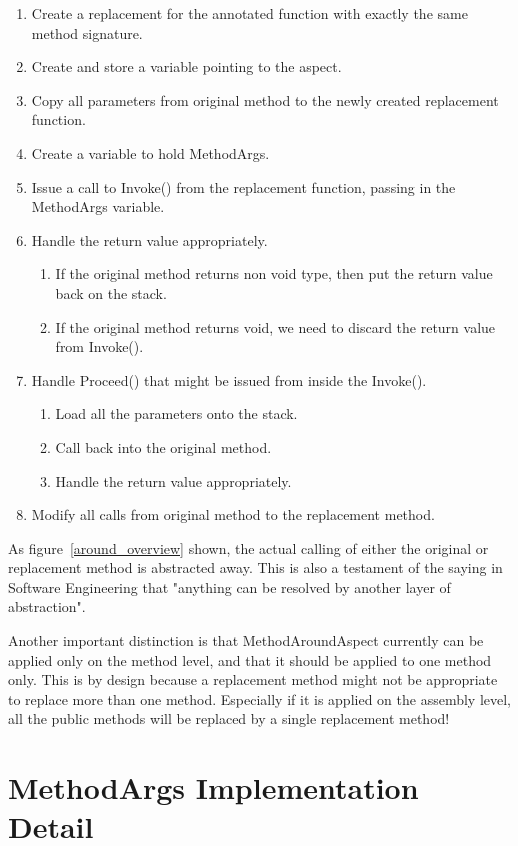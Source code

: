 \begin{enumerate}
	\item Create a replacement for the annotated function with exactly the same method signature.
	\item Create and store a variable pointing to the aspect.
	\item Copy all parameters from original method to the newly created replacement function.
	\item Create a variable to hold MethodArgs.
	\item Issue a call to Invoke() from the replacement function, passing in the MethodArgs variable.
	\item Handle the return value appropriately.
	\begin{enumerate}
		\item If the original method returns non void type, then put the return value back on the stack.
		\item If the original method returns void, we need to discard the return value from Invoke().
	\end{enumerate}
	\item Handle Proceed() that might be issued from inside the Invoke().
	\begin{enumerate}
		\item Load all the parameters onto the stack.
		\item Call back into the original method.
		\item Handle the return value appropriately.
	\end{enumerate}
	\item Modify all calls from original method to the replacement method.
\end{enumerate}

As figure~\ref{around_overview} shown, the actual calling of either the original or replacement method is abstracted away. This is also a testament of the saying in Software Engineering that "anything can be resolved by another layer of abstraction".

Another important distinction is that MethodAroundAspect currently can be applied only on the method level, and that it should be applied to one method only. This is by design because a replacement method might not be appropriate to replace more than one method. Especially if it is applied on the assembly level, all the public methods will be replaced by a single replacement method!

\section{MethodArgs Implementation Detail}

